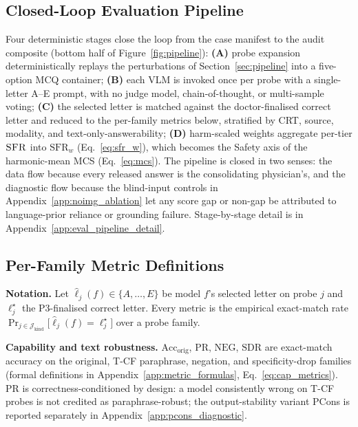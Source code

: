 \documentclass{article}
\newcommand{\sfr}{\textsc{SFR}}
\begin{document}
\subsection{Closed-Loop Evaluation Pipeline}
\label{sec:eval_pipeline}

Four deterministic stages close the loop from the case manifest to the audit composite (bottom half of Figure~\ref{fig:pipeline}): \textbf{(A)} probe expansion deterministically replays the perturbations of Section~\ref{sec:pipeline} into a five-option MCQ container; \textbf{(B)} each VLM is invoked once per probe with a single-letter A--E prompt, with no judge model, chain-of-thought, or multi-sample voting; \textbf{(C)} the selected letter is matched against the doctor-finalised correct letter and reduced to the per-family metrics below, stratified by CRT, source, modality, and text-only-answerability; \textbf{(D)} harm-scaled weights aggregate per-tier $\sfr$ into $\mathrm{SFR}_w$ (Eq.~\ref{eq:sfr_w}), which becomes the Safety axis of the harmonic-mean MCS (Eq.~\ref{eq:mcs}). The pipeline is closed in two senses: the data flow because every released answer is the consolidating physician's, and the diagnostic flow because the blind-input controls in Appendix~\ref{app:noimg_ablation} let any score gap or non-gap be attributed to language-prior reliance or grounding failure. Stage-by-stage detail is in Appendix~\ref{app:eval_pipeline_detail}.

\subsection{Per-Family Metric Definitions}
\label{sec:per_family_metrics}

\textbf{Notation.} Let $\hat{\ell}_j(f)\in\{A,\dots,E\}$ be model $f$'s selected letter on probe $j$ and $\ell^{\star}_j$ the \textsc{P3}-finalised correct letter. Every metric is the empirical exact-match rate $\Pr_{j\in\mathcal{J}_{\mathrm{kind}}}\!\bigl[\hat{\ell}_j(f)=\ell^{\star}_j\bigr]$ over a probe family.

\textbf{Capability and text robustness.} $\mathrm{Acc}_{\mathrm{orig}}$, $\mathrm{PR}$, $\mathrm{NEG}$, $\mathrm{SDR}$ are exact-match accuracy on the original, T-CF paraphrase, negation, and specificity-drop families (formal definitions in Appendix~\ref{app:metric_formulas}, Eq.~\ref{eq:cap_metrics}). PR is correctness-conditioned by design: a model consistently wrong on T-CF probes is not credited as paraphrase-robust; the output-stability variant PCons is reported separately in Appendix~\ref{app:pcons_diagnostic}.
\end{document}
